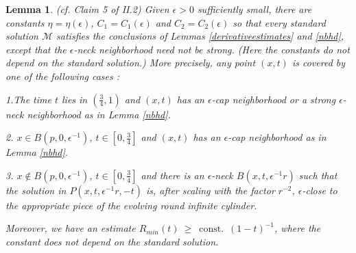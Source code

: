\documentclass[12pt]{amsart}
\newcommand{\const}{\operatorname{const.}}
\newcommand{\M}{{\mathcal M}}
\numberwithin{equation}{section}
\theoremstyle{plain}
\newtheorem{lemma}[equation]{Lemma}
\theoremstyle{definition}
\theoremstyle{remark}
\begin{document}
\begin{lemma} (cf. Claim 5 of II.2) \label{claim5}
Given  $\epsilon > 0$ sufficiently small, there are constants
$\eta = \eta(\epsilon)$, $C_1 = C_1(\epsilon)$ and
$C_2 = C_2(\epsilon)$ so that
every standard solution $\M$ satisfies the conclusions of
Lemmas \ref{derivativeestimates} and \ref{nbhd},
except that the $\epsilon$-neck neighborhood
need not be strong. (Here the constants do not depend on the
standard solution.) More precisely, 
any point $(x,t)$ is covered by one of the following cases : 

1.The time $t$ lies in $(\frac34, 1)$ and 
$(x,t)$ has an $\epsilon$-cap neighborhood
or a strong $\epsilon$-neck neighborhood as in 
Lemma \ref{nbhd}. 

2. $x \in B(p, 0, \epsilon^{-1})$, $t \in [0, \frac34]$ and
$(x,t)$ has an $\epsilon$-cap neighborhood as in Lemma \ref{nbhd}. 

3. $x \notin B(p, 0, \epsilon^{-1})$, $t \in [0, \frac34]$ and
there is an $\epsilon$-neck $B(x,t,\epsilon^{-1} r)$
such that the solution in $P(x,t,\epsilon^{-1}r, -t)$ is, after
scaling with the factor $r^{-2}$, $\epsilon$-close to the appropriate
piece of the evolving round infinite cylinder.

Moreover, we have an estimate $R_{min}(t) \: \ge \: \const \: (1-t)^{-1}$, where
the constant does not depend on the standard solution.
\end{lemma}
\end{document}
